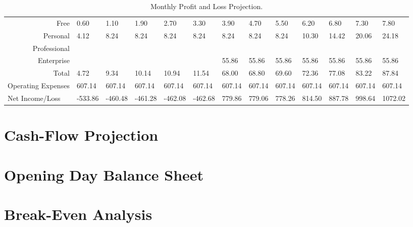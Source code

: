 \begin{sidewaystable}
\begin{table}[H]
\begin{tabularx}{\textwidth}{X X X X X X X X X X X X X}
    \hline

    \multicolumn{1}{r}{Free} & 0.60 & 1.10  & 1.90 & 2.70 & 3.30 & 3.90 & 4.70 & 5.50 & 6.20 & 6.80 & 7.30 & 7.80  \\
    \multicolumn{1}{r}{Personal} & 4.12 & 8.24 & 8.24 & 8.24 & 8.24 & 8.24 & 8.24 & 8.24 & 10.30  & 14.42 & 20.06 & 24.18  \\
    \multicolumn{1}{r}{Professional} &  &  &  &  &  &  &  &  &  &  &  &   \\
    \multicolumn{1}{r}{Enterprise} &  &  &  &  &  & 55.86 & 55.86 & 55.86 & 55.86 & 55.86 & 55.86 & 55.86  \\

    \multicolumn{1}{r}{Total} & 4.72 & 9.34 & 10.14 & 10.94 & 11.54 & 68.00 & 68.80 & 69.60 & 72.36 & 77.08 & 83.22 & 87.84  \\

    \hline

    \multicolumn{1}{l}{Operating Expenses} & 607.14 & 607.14 & 607.14 & 607.14 & 607.14 & 607.14 & 607.14 & 607.14 & 607.14 & 607.14 & 607.14 & 607.14  \\

    \multicolumn{1}{l}{Net Income/Loss} & -533.86 & -460.48 & -461.28 & -462.08 & -462.68 & 779.86 & 779.06 & 778.26 & 814.50 & 887.78 & 998.64 & 1072.02  \\

  \end{tabularx}
  \caption{Monthly Profit and Loss Projection.}
  \label{table.profit.loss}
\end{table}
\end{sidewaystable}


\section{Cash-Flow Projection}

\section{Opening Day Balance Sheet}

\section{Break-Even Analysis}
